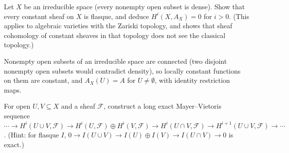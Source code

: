 \begin{exercise}\label{sheaf-cohomology:exercise-noetherian-vanishing}
Let $X$ be an irreducible space (every nonempty open subset is dense). Show that every constant sheaf on $X$ is flasque, and deduce $H^i(X, A_X) = 0$ for $i > 0$. (This applies to
algebraic varieties with the Zariski topology, and shows that sheaf cohomology of constant sheaves in that topology does not see the classical topology.)
\end{exercise}

\begin{solution}
Nonempty open subsets of an irreducible space are connected (two disjoint nonempty open subsets would contradict density), so locally constant functions on them are constant, and
$A_X(U) = A$ for $U \neq \emptyset$, with identity restriction maps.
\end{solution}

\begin{exercise}\label{sheaf-cohomology:exercise-mayer-vietoris-sheaves}
For open $U, V \subseteq X$ and a sheaf $\mathcal{F}$, construct a long exact Mayer--Vietoris sequence
$\cdots \to H^i(U \cup V, \mathcal{F}) \to H^i(U, \mathcal{F}) \oplus H^i(V, \mathcal{F}) \to H^i(U \cap V, \mathcal{F}) \to H^{i+1}(U \cup V, \mathcal{F}) \to \cdots$.
(Hint: for flasque $I$, $0 \to I(U \cup V) \to I(U) \oplus I(V) \to I(U \cap V) \to 0$ is exact.)
\end{exercise}
